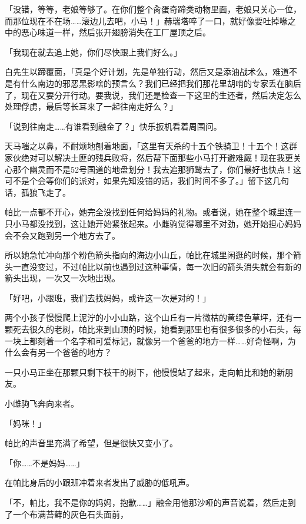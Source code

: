 「没错，等等，老娘等够了。在你们整个肏蛋奇蹄类动物里面，老娘只关心一位，而那位现在不在场……滚边儿去吧，小马！」赫瑞塔啐了一口，就好像要吐掉喙之中的恶心味道一样，然后张开翅膀消失在工厂屋顶之后。

「我现在就去追上她，你们尽快跟上我们好么。」

白先生以蹄覆面，「真是个好计划，先是单独行动，然后又是添油战术么，难道不是有什么南边的邪恶黑影啥的预言么？我们已经把我们那花里胡哨的专家丢在脑后了，现在又要分开行动。要我说，我们还是检查一下这里的生还者，然后决定怎么处理俘虏，最后等长耳来了一起往南走好么？」

「说到往南走……有谁看到融金了？」快乐扳机看着周围问。

天马嗤之以鼻，不耐烦地刨着地面，「这里有天杀的十五个铁骑卫！十五个！这群家伙绝对可以解决土匪的残兵败将，然后帮下面那些小马打开避难厩！现在我更关心那个幽灵而不是52号国道的地盘划分！我去追那狮鹫去了，你们最好也快点！这可不是个会等你们的派对，如果先知没错的话，我们时间不多了。」留下这几句话，孤狼飞走了。

\horizonline


帕比一点都不开心，她完全没找到任何给妈妈的礼物。或者说，她在整个城里连一只小马都没找到，这让她开始紧张起来。小雌驹觉得哪里不对劲，她开始担心妈妈会不会又跑到另一个地方去了。

所以她急忙冲向那个粉色箭头指向的海边小山丘，帕比在城里闲逛的时候，那个箭头一直没变过，不过帕比以前也遇到过这种事情，每一次旧的箭头消失就会有新的箭头出现，一次又一次地出现。

「好吧，小跟班，我们去找妈妈，或许这一次是对的！」

两个小孩子慢慢爬上泥泞的小小山路，这个山丘有一片微枯的黄绿色草坪，还有一颗死去很久的老树，帕比来到山顶的时候，她看到那里也有很多很多的小石头，每一块上都刻着一个名字和可爱标记，就像另一个爸爸的地方一样……好奇怪啊，为什么会有另一个爸爸的地方？

一只小马正坐在那颗只剩下枝干的树下，他慢慢站了起来，走向帕比和她的新朋友。

小雌驹飞奔向来者。

「妈咪！」

帕比的声音里充满了希望，但是很快又变小了。

「你……不是妈妈……」

在帕比身后的小跟班冲着来者发出了威胁的低吼声。

「不，帕比，我不是你的妈妈，抱歉……」融金用他那沙哑的声音说着，然后走到了一个布满苔藓的灰色石头面前，

